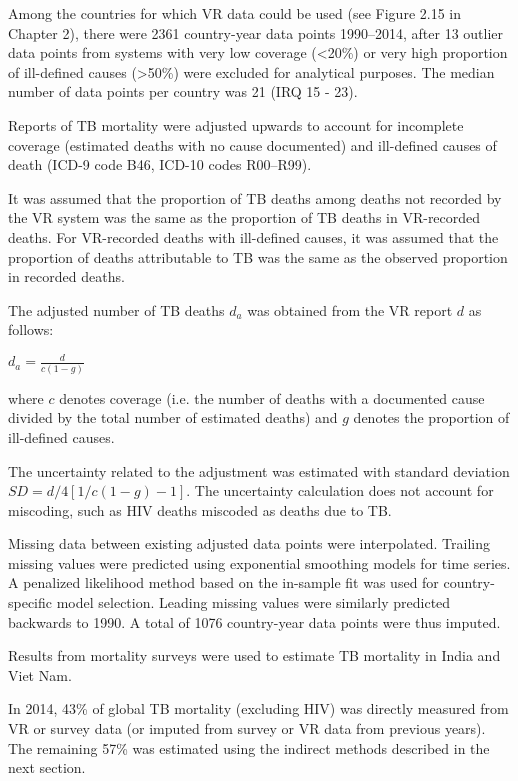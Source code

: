 Among the countries for which VR data could be used (see Figure 2.15 in Chapter 2), there were 2361 country-year data points 1990–2014, after 13 outlier data points from systems with very low coverage (<20\%) or very high proportion of ill-defined causes (>50\%) were excluded for analytical purposes. The median number of data points per country was 21 (IRQ 15 - 23). 

Reports of TB mortality were adjusted upwards to account for incomplete coverage (estimated deaths with no cause documented) and ill-defined causes of death (ICD-9 code B46, ICD-10 codes R00–R99).\cite{15798840}

It was assumed that the proportion of TB deaths among deaths not recorded by the VR system was the same as the proportion of TB deaths in VR-recorded deaths. For VR-recorded deaths with ill-defined causes, it was assumed that the proportion of deaths attributable to TB was the same as the observed proportion in recorded deaths. 

The adjusted number of TB deaths $d_a$ was obtained from the VR report $d$ as follows:

$d_a = \frac{d}{c(1-g)}$

where $c$ denotes coverage (i.e. the number of deaths with a documented cause divided by the total number of estimated deaths) and $g$ denotes the proportion of ill-defined causes.

The uncertainty related to the adjustment was estimated with standard deviation $SD=d/4 [1/c(1-g) -1]$. The uncertainty calculation does not account for miscoding, such as HIV deaths miscoded as deaths due to TB. 

Missing data between existing adjusted data points were interpolated. Trailing missing values were predicted using exponential smoothing models for time series. A penalized likelihood method based on the in-sample fit was used for country-specific model selection. Leading missing values were similarly predicted backwards to 1990. A total of 1076 country-year data points were thus imputed.

Results from mortality surveys were used to estimate TB mortality in India and Viet Nam. 

In 2014, 43\% of global TB mortality (excluding HIV) was directly measured from VR or survey data (or imputed from survey or VR data from previous years). The remaining 57\% was estimated using the indirect methods described in the next section.




